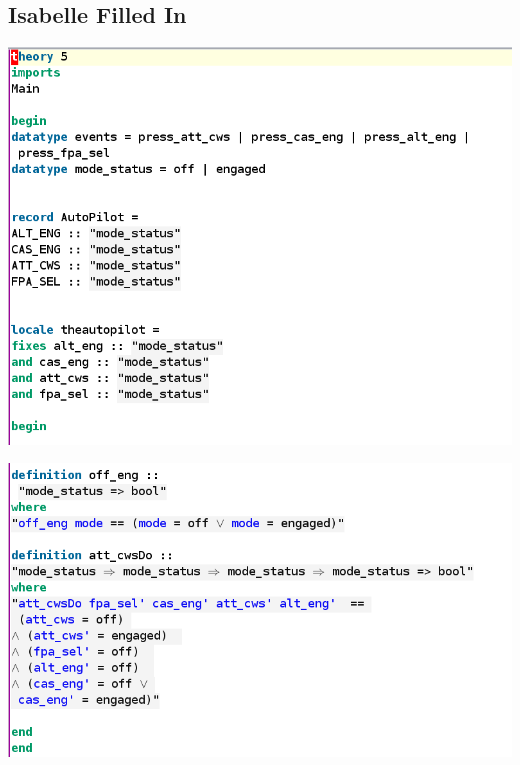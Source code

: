 \subsection{Isabelle Filled In}
\label{app:semiform5}
\includegraphics[scale=0.4]{examples/semiform/5imagea.png}

\noindent \includegraphics[scale=0.4]{examples/semiform/5imageb.png}


